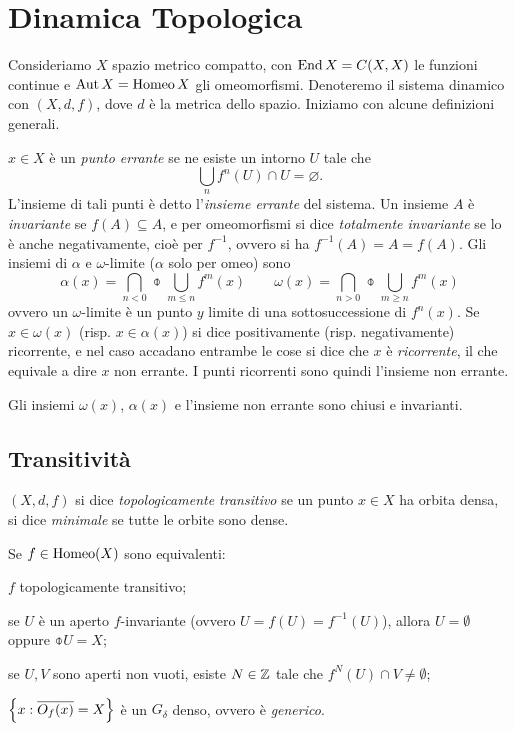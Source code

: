 \section{Dinamica Topologica}

Consideriamo $X$ spazio metrico compatto, con $\operatorname{End} X=C(X,X)$ le funzioni continue e $\operatorname{Aut} X=\operatorname{Homeo} X$ gli omeomorfismi. 
Denoteremo il sistema dinamico con $(X,d,f)$, dove $d$ è la metrica dello spazio. Iniziamo con alcune definizioni generali.

\begin{defi} $x\in X$ è un \emph{punto errante} se ne esiste un intorno $U$ tale che 
\[\bigcup_n f^n(U)\cap U=\varnothing.\]
L'insieme di tali punti è detto l'\emph{insieme errante} del sistema. Un insieme $A$ è \emph{invariante} se $f(A)\subseteq A$, 
e per omeomorfismi si dice \emph{totalmente invariante} se lo è anche negativamente, cioè per $f^{-1}$, ovvero si ha $f^{-1}(A)=A=f(A)$. 
Gli insiemi di $\alpha$ e $\omega$-limite ($\alpha$ solo per omeo) sono
\[\alpha(x)=\bigcap_{n<0}\obar{\bigcup_{m\leq n}f^m(x)}\qquad \omega(x)=\bigcap_{n>0}\obar{\bigcup_{m\geq n}f^m(x)} \]
ovvero un $\omega$-limite è un punto $y$ limite di una sottosuccessione di $f^n(x)$. 
Se $x\in\omega(x)$ (risp. $x\in\alpha(x)$) si dice positivamente (risp. negativamente) ricorrente, e nel caso accadano entrambe le cose si dice che $x$ è \emph{ricorrente}, 
il che equivale a dire $x$ non errante. I punti ricorrenti sono quindi l'insieme non errante.
\end{defi}

\begin{esercizio}
 Gli insiemi $\omega(x)$, $\alpha(x)$ e l'insieme non errante sono chiusi e invarianti.
\end{esercizio}

\subsection{Transitività}

\begin{defi} $(X,d,f)$ si dice \emph{topologicamente transitivo} se un punto $x\in X$ ha orbita densa, si dice \emph{minimale} se tutte le orbite sono dense.
\end{defi}

\begin{prop}Se $f\in\operatorname{Homeo} (X)$ sono equivalenti:
\begin{lista}
	\item $f$ topologicamente transitivo;
	\item se $U$ è un aperto $f$-invariante (ovvero $U=f(U)=f^{-1}(U)$), allora $U=\emptyset$ oppure $\obar{U}=X$;
	\item se $U,V$ sono aperti non vuoti, esiste $N\in\mathbb{Z}$ tale che $f^N(U)\cap V\neq\emptyset$;
	\item $\left\{x:\overline{O_f(x)}=X\right\}$ è un $G_\delta$ denso, ovvero è \emph{generico}.
\end{lista}
\end{prop}

